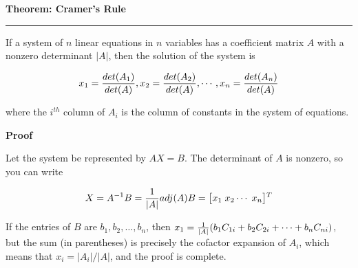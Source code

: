 \nopagenumbers
{\bf Theorem: Cramer's Rule}
\vskip 1mm
\hrule

\vskip 6pt
If a system of $n$ linear equations in $n$ variables has a coefficient matrix $A$ with a nonzero determinant $|A|$, then the solution of the system is

$$x_1={det(A_1)\over det(A)},x_2={det(A_2)\over det(A)},\cdots,x_n={det(A_n)\over det(A)}$$

where the $i^{th}$ column of $A_i$ is the column of constants in the system of equations.

\vskip 10pt
{\bf Proof}

\vskip 6pt
Let the system be represented by $AX=B$. The determinant of $A$ is nonzero, so you can write

$$X=A^{-1}B={1\over |A|}adj(A)B=\bigl\lbrack x_1\;x_2\cdots\;x_n\bigr\rbrack{}^T$$

If the entries of $B$ are $b_1,b_2,\ldots,b_n$, then $x_1={1\over |A|}(b_{1}C_{1i}+b_{2}C_{2i}+\cdots+b_{n}C_{ni})$, but the sum (in parentheses) is precisely the cofactor expansion of $A_i$, which means that $x_i=|A_i|/|A|$, and the proof is complete.

\vfill\eject
\bye
